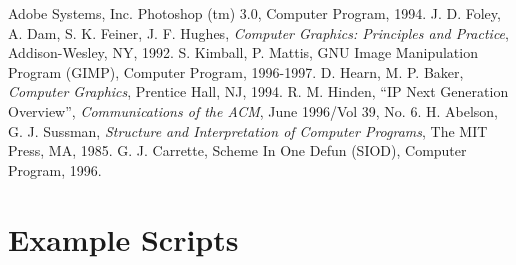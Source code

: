 \documentclass{article}
\begin{document}
\begin{flushleft}
\begin{thebibliography}{References}
 Adobe Systems, Inc.  Photoshop (tm) 3.0,
 Computer Program, 1994.
 J. D. Foley, A. Dam, S. K. Feiner, J. F. Hughes,
 \emph{Computer Graphics: Principles and Practice},
 Addison-Wesley, NY, 1992.
 S. Kimball, P. Mattis, GNU Image Manipulation
 Program (GIMP), Computer Program, 1996-1997.
 D. Hearn, M. P. Baker,
 \emph{Computer Graphics},
 Prentice Hall, NJ, 1994.
 R. M. Hinden, ``IP Next Generation Overview'',
 \emph{Communications of the ACM},
 June 1996/Vol 39, No. 6.
 H. Abelson, G. J. Sussman,
 \emph{Structure and Interpretation of Computer Programs},
 The MIT Press, MA, 1985.
 G. J. Carrette, Scheme In One Defun (SIOD),
 Computer Program, 1996.
\end{thebibliography}
\end{flushleft}

\onecolumn
\appendix

\section{Example Scripts}
\end{document}
